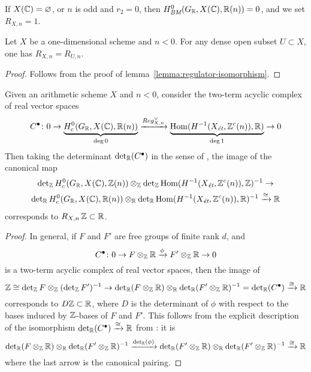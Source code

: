 \documentclass{article}
\numberwithin{equation}{section}
\begin{document}
If $X(\CC) = \emptyset$, or $n$ is odd and $r_2 = 0$, then
$H^0_\BM (G_\RR, X(\CC), \RR (n)) = 0$, and we set $R_{X,n} = 1$.

\begin{lemma}
  \label{lemma:regulator-dense-open-subset}
  Let $X$ be a one-dimensional scheme and $n < 0$. For any dense open subset
  $U \subset X$, one has $R_{X,n} = R_{U,n}$.

  \begin{proof}
    Follows from the proof of lemma~\ref{lemma:regulator-isomorphism}.
  \end{proof}
\end{lemma}

\begin{proposition}
  \label{prop:trivialization-of-free-part}
  Given an arithmetic scheme $X$ and $n < 0$, consider the two-term acyclic
  complex of real vector spaces
  \[ C^\bullet\colon
    0 \to
    \underbrace{H^0_c (G_\RR, X(\CC), \RR(n))}_{\deg 0}
    \xrightarrow{Reg_{X,n}^\vee}
    \underbrace{\Hom (H^{-1} (X_\et, \ZZ^c (n)), \RR)}_{\deg 1}
    \to 0 \]
  Then taking the determinant $\det_\RR (C^\bullet)$ in the sense of
  \cite{Knudsen-Mumford-1976}, the image of the canonical map
  \begin{multline*}
    \det_\ZZ H^0_c (G_\RR, X(\CC), \ZZ(n)) \otimes_\ZZ
    \det_\ZZ \Hom (H^{-1} (X_\et, \ZZ^c (n)), \ZZ)^{-1} \to \\
    \det_\RR H^0_c (G_\RR, X(\CC), \RR (n)) \otimes_\RR
    \det_\RR \Hom (H^{-1} (X_\et, \ZZ^c (n)), \RR)^{-1}
    \xrightarrow{\cong} \RR
  \end{multline*}
  corresponds to $R_{X,n}\,\ZZ \subset \RR$.

  \begin{proof}
    In general, if $F$ and $F'$ are free groups of finite rank $d$, and
    $$C^\bullet\colon 0 \to F\otimes_\ZZ \RR \xrightarrow{\phi} F'\otimes_\ZZ \RR \to 0$$
    is a two-term acyclic complex of real vector spaces, then the image of
    \[ \ZZ \cong \det_\ZZ F \otimes_\ZZ (\det_\ZZ F')^{-1} \to
      \det_\RR (F\otimes_\ZZ \RR) \otimes_\RR \det_\RR (F' \otimes_\ZZ \RR)^{-1}
      = \det_\RR (C^\bullet) \xrightarrow{\cong} \RR \]
    corresponds to $D\ZZ \subset \RR$, where $D$ is the determinant of $\phi$ with
    respect to the bases induced by $\ZZ$-bases of $F$ and $F'$.
    This follows from the explicit description of the isomorphism
    $\det_\RR (C^\bullet) \xrightarrow{\cong} \RR$ from
    \cite[p.\,33]{Knudsen-Mumford-1976}: it is
    \[ \det_\RR (F \otimes_\ZZ \RR) \otimes_\RR
      \det_\RR (F'\otimes_\ZZ \RR)^{-1} \xrightarrow{\det_\RR (\phi)}
      \det_\RR (F' \otimes_\ZZ \RR) \otimes_\RR
      \det_\RR (F' \otimes_\ZZ \RR)^{-1} \xrightarrow{\cong} \RR \]
    where the last arrow is the canonical pairing.


\end{proof}
\end{proposition}
\end{document}
